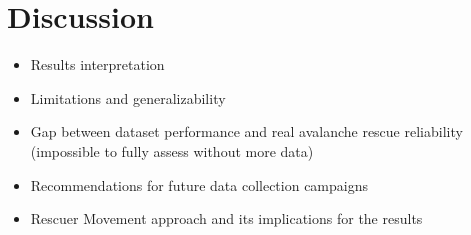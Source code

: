 \chapter{Discussion}
\begin{itemize}
\item Results interpretation
\item Limitations and generalizability 
\item Gap between dataset performance and real avalanche rescue reliability (impossible to fully assess without more data)
\item Recommendations for future data collection campaigns
\item Rescuer Movement approach and its implications for the results
\end{itemize}